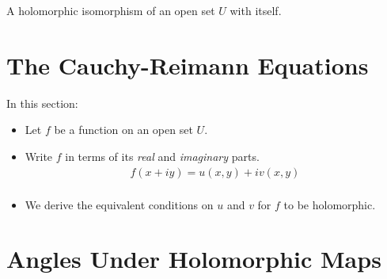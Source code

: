 \begin{defn}
	A holomorphic isomorphism of an open set $U$ with itself.
\end{defn}

\section{The Cauchy-Reimann Equations}
In this section:
\begin{itemize}
	\item Let $f$ be a function on an open set $U.$
	\item Write $f$ in terms of its \textit{real} and \textit{imaginary} parts.
	\begin{align*}
		f(x + iy) = u(x, y) + iv(x, y) \\
	\end{align*}
	\item We derive the equivalent conditions on $u$ and $v$ for $f$ to be holomorphic.
\end{itemize}



\section{Angles Under Holomorphic Maps}
